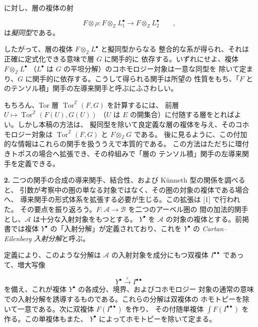 \clearpage
{}
に対し、層の複体の射

\[
F\otimes\rho:
F\otimes_{\mathbb Z}L_1^{\bullet}
\longrightarrow
F\otimes_{\mathbb Z}L_2^{\bullet}
\qquad\text{,}
\]
は\emph{擬同型}である。

したがって、層の複体 $F\otimes_{\mathbb Z}L^{\bullet}$ と擬同型からなる
整合的な系が得られ、それは正確に定式化できる意味で層 $G$ に関手的に
依存する。いずれにせよ、複体 $F\otimes_{\mathbb Z}L^{\bullet}$
（$L^{\bullet}$ は $G$ の平坦分解）のコホモロジー対象は一意な同型を
除いて定まり、$G$ に関手的に依存する。こうして得られる関手は所望の
性質をもち、「$F$ とのテンソル積」関手の左導来関手と呼ぶにふさわしい。

もちろん、Tor 層 $\operatorname{Tor}^{\mathbb Z}(F,G)$ を計算するには、
前層 $U\longmapsto\operatorname{Tor}^{\mathbb Z}(F(U),G(U))$
（$U$ は $E$ の開集合）に付随する層をとればよい。しかし本稿の方法は、
擬同型を除いて良定義な層の複体を与え、そのコホモロジー対象は
$\operatorname{Tor}^{\mathbb Z}(F,G)$ と $F\otimes_{\mathbb Z}G$ である。
後に見るように、この付加的な情報はこれらの関手を扱ううえで本質的である。
この方法はただちに環付きトポスの場合へ拡張でき、その枠組みで「層の
テンソル積」関手の左導来関手を定義できる。

\noindent\textbf{2.}\quad
二つの関手の合成の導来関手、結合性、および Künneth 型の関係を調べると、
引数が考察中の圏の単なる対象ではなく、その圏の対象の複体である場合へ、
導来関手の形式体系を拡張する必要が生じる。この拡張は [1] で行われた。
その要点を振り返ろう。$F:\mathcal A\to\mathcal B$ を二つのアーベル圏の
間の加法的関手とし、$\mathcal A$ は十分な入射対象をもつとする。
$Y^{\bullet}$ を $\mathcal A$ の対象の複体とする。前掲書では複体
$Y^{\bullet}$ の「入射分解」が定義されており、これを $Y^{\bullet}$ の
\emph{Cartan--Eilenberg 入射分解}と呼ぶ。

定義により、このような分解は $\mathcal A$ の入射対象を成分にもつ双複体
$I^{\bullet\bullet}$ であって、増大写像

\[
Y^{\bullet}\xrightarrow{\varepsilon}I^{\bullet\bullet}
\]
を備え、これが複体 $Y^{\bullet}$ の各成分、境界、およびコホモロジー
対象の通常の意味での入射分解を誘導するものである。これらの分解は双複体の
ホモトピーを除いて一意である。次に双複体 $F(I^{\bullet\bullet})$ を作り、
その付随単複体 $\int F(I^{\bullet\bullet})$ を作る。この単複体もまた、
$Y^{\bullet}$ によってホモトピーを除いて定まる。
